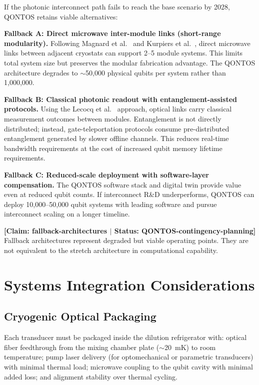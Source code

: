 \documentclass[conference]{IEEEtran}
\begin{document}
If the photonic interconnect path fails to reach the base scenario by 2028, QONTOS retains viable alternatives:

\textbf{Fallback A: Direct microwave inter-module links (short-range modularity).} Following Magnard et al.~\cite{Magnard2020} and Kurpiers et al.~\cite{Kurpiers2018}, direct microwave links between adjacent cryostats can support 2--5 module systems. This limits total system size but preserves the modular fabrication advantage. The QONTOS architecture degrades to $\sim$50,000 physical qubits per system rather than 1,000,000.

\textbf{Fallback B: Classical photonic readout with entanglement-assisted protocols.} Using the Lecocq et al.~\cite{Lecocq2021} approach, optical links carry classical measurement outcomes between modules. Entanglement is not directly distributed; instead, gate-teleportation protocols consume pre-distributed entanglement generated by slower offline channels. This reduces real-time bandwidth requirements at the cost of increased qubit memory lifetime requirements.

\textbf{Fallback C: Reduced-scale deployment with software-layer compensation.} The QONTOS software stack and digital twin provide value even at reduced qubit counts. If interconnect R\&D underperforms, QONTOS can deploy 10,000--50,000 qubit systems with leading software and pursue interconnect scaling on a longer timeline.

\textbf{[Claim: fallback-architectures $|$ Status: QONTOS-contingency-planning]} Fallback architectures represent degraded but viable operating points. They are not equivalent to the stretch architecture in computational capability.

\section{Systems Integration Considerations}

\subsection{Cryogenic Optical Packaging}

Each transducer must be packaged inside the dilution refrigerator with: optical fiber feedthrough from the mixing chamber plate ($\sim$20~mK) to room temperature; pump laser delivery (for optomechanical or parametric transducers) with minimal thermal load; microwave coupling to the qubit cavity with minimal added loss; and alignment stability over thermal cycling.
\end{document}
